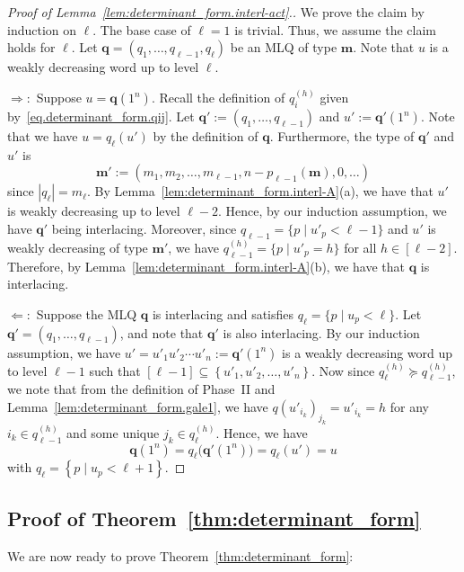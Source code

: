 \documentclass[reqno]{amsart}
\newcommand{\0}{\phantom{c}}
\newcommand{\mm}{\mathbf{m}}
\newcommand{\qq}{\mathbf{q}}
\newcommand{\set}[1]{\left\{ #1 \right\}}
\newcommand{\abs}[1]{\left| #1 \right|}
\newcommand{\tup}[1]{\left( #1 \right)}
\newcommand{\ive}[1]{\left[ #1 \right]}
\theoremstyle{plain}
\theoremstyle{definition}
\numberwithin{equation}{section}
\begin{document}
\begin{proof}[Proof of Lemma~\ref{lem:determinant_form.interl-act}.]
We prove the claim by induction on $\ell$.
The base case of $\ell = 1$ is trivial.
Thus, we assume the claim holds for $\ell$.
Let $\qq = \tup{q_1, \dotsc, q_{\ell-1}, q_{\ell}}$ be an MLQ of type $\mm$.
Note that $u$ is a weakly decreasing word up to level $\ell$.

$\Longrightarrow:$
Suppose $u = \qq(1^n)$.
Recall the definition of $q_i^{(h)}$ given by~\eqref{eq.determinant_form.qij}.
Let $\qq' := \tup{q_1, \dotsc, q_{\ell-1}}$ and $u' := \qq'(1^n)$.
Note that we have $u = q_{\ell}(u')$ by the definition of $\qq$.
Furthermore, the type of $\qq'$ and $u'$ is
\[
\mm' := (m_1, m_2, \dotsc, m_{\ell-1}, n - p_{\ell-1}(\mm), 0, \ldots)
\]
since $\abs{q_{\ell}} = m_{\ell}$.
By Lemma~\ref{lem:determinant_form.interl-A}(a), we have that $u'$ is weakly decreasing up to level $\ell-2$.
Hence, by our induction assumption, we have $\qq'$ being interlacing.
Moreover, since $q_{\ell-1} = \{p \mid u'_p < \ell-1\}$ and $u'$ is weakly decreasing of type $\mm'$, we have $q_{\ell-1}^{(h)} = \{p \mid u'_p = h\}$ for all $h \in \ive{\ell-2}$.
Therefore, by Lemma~\ref{lem:determinant_form.interl-A}(b), we have that $\qq$ is interlacing.

$\Longleftarrow:$
Suppose the MLQ $\qq$ is interlacing and satisfies $q_{\ell} = \{ p \mid u_p < \ell \}$.
Let $\qq' = \tup{q_1, \dotsc, q_{\ell-1}}$, and note that $\qq'$ is also interlacing.
By our induction assumption, we have $u' = u'_1 u'_2 \dotsm u'_n  := \qq'(1^n)$ is a weakly decreasing word up to level $\ell - 1$ such that $\ive{\ell-1} \subseteq \set{u'_1, u'_2, \dotsc, u'_n}$.
Now since $q_{\ell}^{(h)} \succeq q_{\ell-1}^{(h)}$, we note that from the definition of Phase~II and Lemma~\ref{lem:determinant_form.gale1}, we have $q(u'_{i_k})_{j_k} = u'_{i_k} = h$ for any $i_k \in q_{\ell-1}^{(h)}$ and some unique $j_k \in q_{\ell}^{(h)}$.
Hence, we have
\[
\qq(1^n) = q_{\ell}\bigl( \qq'(1^n) \bigr) = q_{\ell}(u') = u
\]
with $q_{\ell} = \set{p \mid u_p < \ell+1}$.
\end{proof}


\subsection{Proof of Theorem~\ref{thm:determinant_form}}

We are now ready to prove Theorem~\ref{thm:determinant_form}:
\end{document}
